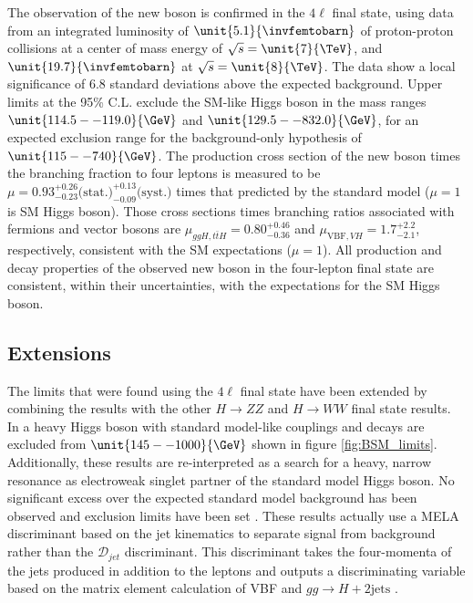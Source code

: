 The observation of the new boson is confirmed in the $4\ell$ final state, using data from an integrated luminosity of $\unit{5.1}{\invfemtobarn}$ of proton-proton collisions at a center of mass energy of $\sqrt{s} = \unit{7}{\TeV}$, and $\unit{19.7}{\invfemtobarn}$ at $\sqrt{s} = \unit{8}{\TeV}$. The data show a local significance of
6.8 standard deviations above the expected background. Upper
limits at the 95\% C.L. exclude the SM-like Higgs boson in the mass
ranges $\unit{114.5--119.0}{\GeV}$ and $\unit{129.5--832.0}{\GeV}$, for an expected
exclusion range for the background-only hypothesis of $\unit{115--740}{\GeV}$. The production cross section of the new boson times the branching
fraction to four leptons is measured to be $\mu = 0.93^{+0.26}_{-0.23}\text{(stat.)} ^{+0.13}_{-0.09}\text{(syst.)}$ times that
predicted by the standard model ($\mu = 1$ is SM Higgs boson). Those cross sections times branching ratios associated with fermions and
vector bosons are $\mu_{ggH,t\bar{t}H} = 0.80^{+0.46}_{-0.36}$ and $\mu_{\text{VBF}, VH} = 1.7^{+2.2}_{-2.1}$, respectively,
consistent with the SM expectations ($\mu = 1$). All production and decay properties of the observed new boson in the
four-lepton final state are consistent, within their uncertainties,
with the expectations for the SM Higgs boson.
 
\subsection{Extensions}

The limits that were found using the $4\ell$ final state have been extended by combining the results with the other $H \to ZZ$ and $H \to WW$ final state results. In \cite{Khachatryan:2015cwa} a heavy Higgs boson with standard model-like couplings and decays are excluded from $\unit{145--1000}{\GeV}$ shown in figure \ref{fig:BSM_limits}. Additionally, these results are re-interpreted as a search for a heavy, narrow resonance as electroweak singlet partner of the standard model Higgs boson. No significant excess over the expected standard model background has been observed and exclusion limits have been set \cite{Khachatryan:2015cwa}. These results actually use a MELA discriminant based on the jet kinematics to separate signal from background rather than the $\mathcal{D}_{jet}$ discriminant. This discriminant takes the four-momenta of the jets produced in addition to the leptons and outputs a discriminating variable based on the matrix element calculation of VBF and $gg \to H +2\text{jets}$ \cite{Anderson:2013afp}.


